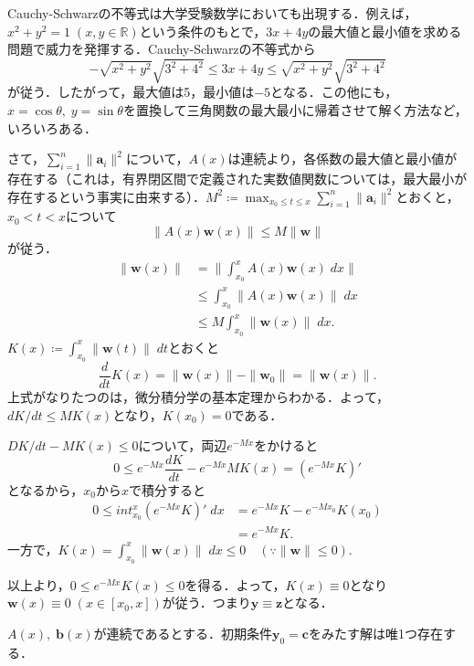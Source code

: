 \begin{talk*}
    Cauchy-Schwarzの不等式は大学受験数学においても出現する．例えば，$x^2+y^2=1 \; (x,y \in \mathbb{R})$という条件のもとで，$3x+4y$の最大値と最小値を求める問題で威力を発揮する．Cauchy-Schwarzの不等式から
    \[ -\sqrt{x^2+y^2}\sqrt{3^2+ 4^2} \leq 3x+4y \leq \sqrt{x^2+y^2}\sqrt{3^2+ 4^2}\]
    が従う．したがって，最大値は5，最小値は$-5$となる．この他にも，$x=\cos \theta, \; y=\sin \theta$を置換して三角関数の最大最小に帰着させて解く方法など，いろいろある．
\end{talk*}

さて，$\sum_{i=1}^{n} \| \bm{a}_i\|^2$について，$A(x)$は連続より，各係数の最大値と最小値が存在する（これは，有界閉区間で定義された実数値関数については，最大最小が存在するという事実に由来する）．$M ^2 \coloneqq \max_{x_0 \leq t \leq x} \sum_{i=1}^{n} \|\bm{a}_i\|^2$とおくと，$x_0<t<x$について
\[ \|A(x)\bm{w}(x)\| \leq M\|\bm{w}\|\]
が従う．
\begin{align*}
    \|\bm{w}(x)\| &= \|\int_{x_0}^{x} A(x)\bm{w}(x) \; dx\| \\
    &\leq \int_{x_0}^{x} \|A(x)\bm{w}(x)\| \; dx \\
    &\leq M \int_{x_0}^{x} \|\bm{w}(x)\| \; dx.
\end{align*}
$K(x) \coloneqq \int_{x_0}^{x} \|\bm{w}(t)\| \; dt$とおくと
\[ \frac{d}{dt}K(x) = \|\bm{w}(x)\| - \|\bm{w}_0\| = \|\bm{w}(x)\|.\]
上式がなりたつのは，微分積分学の基本定理からわかる．よって，$dK/dt \leq MK(x)$となり，$K(x_0)=0$である．

$DK/dt - MK(x) \leq 0$について，両辺$e^{-Mx}$をかけると
\[ 0 \leq e^{-Mx}\frac{dK}{dt} - e^{-Mx}MK(x) = (e^{-Mx}K)'\]
となるから，$x_0$から$x$で積分すると
\begin{align*}
    0 \leq int_{x_0}^{x} (e^{-Mx}K)' \; dx &= e^{-Mx}K - e^{-Mx_0}K(x_0) \\
    &= e^{-Mx}K.
\end{align*}
一方で，$K(x)=\int_{x_0}^x \|\bm{w}(x)\| \; dx \leq 0 \quad (\because \|\bm{w}\| \leq 0).$

以上より，$0 \leq e^{-Mx}K(x) \leq 0$を得る．よって，$K(x) \equiv 0$となり$\bm{w}(x) \equiv 0 \; (x \in [x_0,x])$が従う．つまり$\bm{y} \equiv \bm{z}$となる．

\begin{theorem}
    $A(x),\; \bm{b}(x)$が連続であるとする．初期条件$\bm{y}_0=\bm{c}$をみたす解は唯1つ存在する．
\end{theorem}